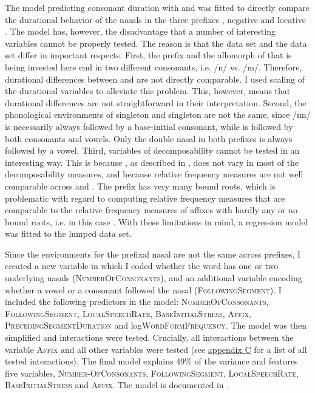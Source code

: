 The model predicting consonant duration with  and  was fitted to directly compare the durational behavior of the nasals in the three prefixes , negative  and locative . The model has, however, the disadvantage that a number of interesting variables cannot be properly tested. The reason is that the  data set and the data set differ in important respects.
First, the prefix  and the allomorph of  that is being invested here end in two different consonants, i.e.  /n/ vs. /m/. Therefore, durational differences between  and  are not directly comparable. I  used scaling of the durational variables to alleviate this problem. This, however, means that durational differences are not straightforward in their interpretation. 
Second, the phonological environments of singleton  and singleton  are not the same, since /ɪm/ is necessarily always followed by a base-initial consonant, while  is followed by both consonants and vowels. Only the double nasal in both prefixes is always followed by a vowel.
Third, variables of decomposability  cannot be tested in an interesting way. This is because , as described in , does not vary in most of the decomposability measures, and because relative frequency measures are not well comparable across  and . The prefix  has very many bound roots, which is problematic with regard to computing relative frequency measures that are comparable to the relative frequency measures of affixes with hardly any or no bound roots, i.e. in this case . 
With these limitations in mind, a regression model was fitted to the lumped data set.  

Since the environments for the prefixal nasal are not the same across prefixes, I created a new variable in which I coded whether the word has one or two underlying nasals (\textsc{NumberOfConsonants}), and an additional variable encoding whether a vowel or a consonant followed the nasal (\textsc{FollowingSegment}). I included the following predictors in the model: \textsc{NumberOfConsonants}, \textsc{FollowingSegment}, \textsc{LocalSpeechRate},  \textsc{BaseInitialStress}, \textsc{Affix}, \textsc{PrecedingSegmentDuration} and log\textsc{WordFormFrequency}.
The model was then simplified and interactions were tested. Crucially, all interactions between the variable \textsc{Affix} and all other variables were tested (see \hyperref[Appendix C: Summaries of tested interactions in corpus study]{appendix C} for a list of all tested interactions). 
The final model explains 49\% of the variance and features five variables, \textsc{Number-OfConsonants}, \textsc{FollowingSegment}, \textsc{LocalSpeechRate}, \textsc{BaseInitialStress} and \textsc{Affix}. The model is documented in .




